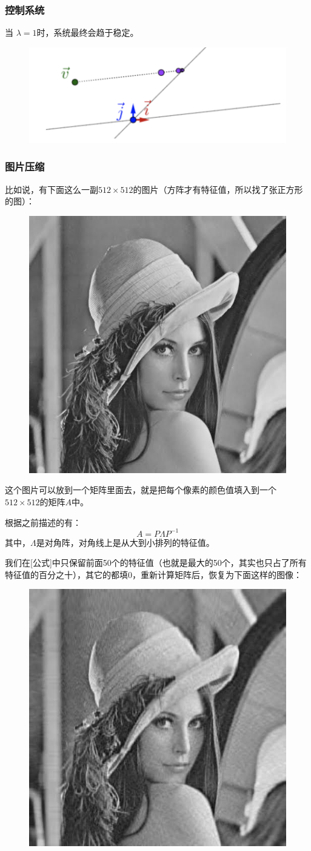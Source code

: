\documentclass[12pt]{article}
\begin{document}
\subsubsection{控制系统}
当 $\lambda = 1时$，系统最终会趋于稳定。
\begin{figure}[H]
    \centering
    \includegraphics[width=.5\textwidth]{fig/UnderstandEigenValueVector_11.png}
\end{figure} 

\subsubsection{图片压缩}
比如说，有下面这么一副$512\times512$的图片（方阵才有特征值，所以找了张正方形的图）：
\begin{figure}[H]
    \centering
    \includegraphics[width=.3\textwidth]{fig/UnderstandEigenValueVector_12.jpg}
\end{figure} 

这个图片可以放到一个矩阵里面去，就是把每个像素的颜色值填入到一个$512\times512$的矩阵$A$中。

根据之前描述的有：
$$
A = P\Lambda P^{-1}
$$
其中，$\Lambda$是对角阵，对角线上是从大到小排列的特征值。

我们在[公式]中只保留前面50个的特征值（也就是最大的50个，其实也只占了所有特征值的百分之十），其它的都填0，重新计算矩阵后，恢复为下面这样的图像：
\begin{figure}[H]
    \centering
    \includegraphics[width=.3\textwidth]{fig/UnderstandEigenValueVector_13.jpg}
\end{figure} 
\end{document}
